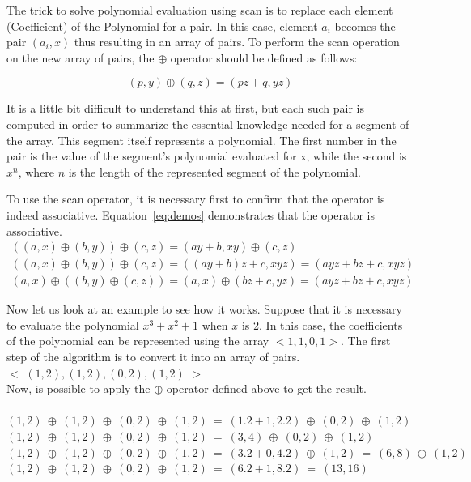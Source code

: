 \documentclass[Ingles]{ic-tese-v1}
\newcommand{\req}[1]{Equation~\ref{eq:#1}}
\begin{document}
The trick to solve polynomial evaluation using scan is to replace each element (Coefficient) of the Polynomial for a pair. In this case,
element $a_{i}$ becomes the pair $(a_{i}, x)$ thus resulting in an array of pairs. To perform the scan operation on the new array of pairs,
the $\oplus$ operator should be defined  as follows:

\begin{equation}
(p, y) \oplus (q, z) = (p z + q, y z)
\label{eq:opepol}
\end{equation}

It is a little  bit difficult to understand this at first, but
each such pair is computed in order to summarize the essential knowledge needed for a
segment of the array. This segment itself represents a polynomial. The first
number in the pair is the value of the segment's polynomial evaluated for x,
while the second is $x^{n}$, where $n$ is the length of the represented segment
of the polynomial.

To use the scan operator, it is  necessary first to confirm that the operator is indeed associative.
\req{demos}  demonstrates that the operator is associative.
\begin{equation}
\begin{split}
((a, x) \oplus (b, y)) \oplus (c, z) = (a y + b, x y) \oplus (c, z) \\
((a, x) \oplus (b, y)) \oplus (c, z) = ((a y + b) z + c, x y z) = (a y z + b z + c, x y z)\\
(a, x) \oplus ((b, y) \oplus (c, z)) = (a, x) \oplus (b z + c, y z) = (a y z + b z + c, x y z)
\end{split}
\label{eq:demos}
\end{equation}

Now let us look at an example to see how it works. Suppose that it is necessary to evaluate the
polynomial $x^{3} + x^{2} + 1$ when $x$ is 2. In this case, the coefficients of the
polynomial can be represented using the array $<1, 1, 0, 1>$. The first step of the
algorithm is to convert it into an array of pairs.\\

$<$ $(1, 2), (1, 2), (0, 2), (1, 2)$ $>$\\

Now, is possible to apply the $\oplus$ operator defined above to get the result.\\\\
$(1, 2)\:\oplus\:(1, 2)\:\oplus\:(0, 2)\:\oplus\:(1, 2)\:=\:(1 . 2 + 1, 2 . 2)\:\oplus\:(0, 2)\: \oplus\:(1, 2)$\\
$(1, 2)\:\oplus\:(1, 2)\:\oplus\:(0, 2)\:\oplus\:(1, 2)\:=\:(3, 4)\:\oplus\:(0, 2)\:\oplus\:(1, 2)$\\
$(1, 2)\:\oplus\:(1, 2)\:\oplus\:(0, 2)\:\oplus\:(1, 2)\:=\:(3. 2 + 0, 4 . 2)\:\oplus\:(1, 2)\:=\:(6, 8)\:\oplus\:(1, 2)$\\
$(1, 2)\:\oplus\:(1, 2)\:\oplus\:(0, 2)\:\oplus\:(1, 2)\:=\:(6 . 2 + 1, 8 . 2) \:=\:(13, 16)$\\\\
\end{document}
